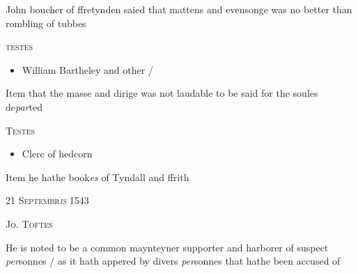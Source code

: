 \documentclass[12pt, a4paper]{book}
\begin{document}
               		
		\ifthenelse{\isodd{\thepage}}
		{\reversemarginpar}
		{\normalmarginpar}
		John boucher of ffretynden saied that mattens and
  evensonge was no better than rombling of tubbes
               	
 
 	\begin{center} {\scshape testes} \end{center}\begin{itemize}
 	
 	\item[]William Bartheley and other /
 \end{itemize}
 

	
			
	
		\ifthenelse{\isodd{\thepage}}
		{\reversemarginpar}
		{\normalmarginpar}
		Item that the masse and dirige was not laudable
 to be said for the soules de\textit{par}ted

\begin{center} {\scshape Testes} \end{center}\begin{itemize}
	\item[]Clerc of hedcorn\end{itemize}

		\ifthenelse{\isodd{\thepage}}
		{\reversemarginpar}
		{\normalmarginpar}
		Item he hathe book\textit{es} of Tyndall and ffrith
 

            
            
               
				\begin{center} \begin{large} {\scshape 
                  21 Septembr\textit{is} 1543
               } \end{large} \end{center}
			
               
                  
				\begin{center}  {\scshape Jo. Toftes}  \end{center}
			

               	
	
		\ifthenelse{\isodd{\thepage}}
		{\reversemarginpar}
		{\normalmarginpar}
		He is noted to be a common maynteyner supporter and
 harborer of suspect \textit{per}sonnes / as it hath appered
 by divers \textit{per}sonnes that hathe been accused of
               	
\end{document}
